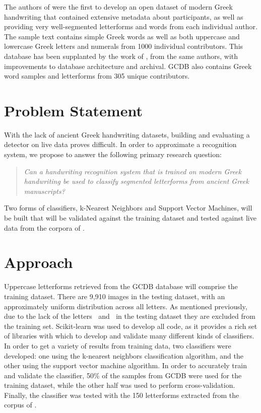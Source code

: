 \documentclass[10pt,twocolumn,letterpaper]{article}
\begin{document}
The authors of \cite{GRUHD} were the first to develop an open dataset of modern Greek handwriting that contained extensive metadata about participants, as well as providing very well-segmented letterforms and words from each individual author. The sample text contains simple Greek words as well as both uppercase and lowercase Greek letters and numerals from 1000 individual contributors. This database has been supplanted by the work of \cite{GCDB}, from the same authors, with improvements to database architecture and archival. GCDB also contains Greek word samples and letterforms from 305 unique contributors.

\section{Problem Statement}

With the lack of ancient Greek handwriting datasets, building and evaluating a detector on live data proves difficult. In order to approximate a recognition system, we propose to answer the following primary research question:

\begin{quote}
    \textit{Can a handwriting recognition system that is trained on modern Greek handwriting be used to classify segmented letterforms from ancient Greek manuscripts?}
\end{quote}

Two forms of classifiers, k-Nearest Neighbors and Support Vector Machines, will be built that will be validated against the training dataset and tested against live data from the corpora of \cite{BYU}.

\section{Approach}

Uppercase letterforms retrieved from the GCDB database will comprise the training dataset. There are 9,910 images in the testing dataset, with an approximately uniform distribution across all letters. As mentioned previously, due to the lack of the letters \textPsi$\:$ and \textXi$\:$ in the testing dataset they are excluded from the training set. Scikit-learn \cite{scikit-learn} was used to develop all code, as it provides a rich set of libraries with which to develop and validate many different kinds of classifiers. In order to get a variety of results from training data, two classifiers were developed: one using the k-nearest neighbors classification algorithm, and the other using the support vector machine algorithm. In order to accurately train and validate the classifier, 50\% of the samples from GCDB were used for the training dataset, while the other half was used to perform cross-validation. Finally, the classifier was tested with the 150 letterforms extracted from the corpus of \cite{BYU}.
\end{document}

